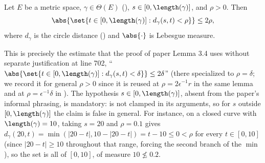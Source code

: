 \begin{helper}
  Let $E$ be a metric space, $\gamma \in \Theta(E)$ (), $s \in [0,\length(\gamma)]$,
  and $\rho > 0$. Then
  \[
    \abs{\set{t \in [0,\length(\gamma)] : d_\gamma(s,t) < \rho}} \leq 2\rho
    ,
  \]
  where $d_\gamma$ is the circle distance () and $\abs{\cdot}$ is Lebesgue measure.

  This is precisely the estimate that the proof of paper Lemma 3.4 uses without separate
  justification at line 702, ``$\abs{\set{t\in[0,\length(\gamma)]:d_\gamma(s,t)<\delta}} \leq
  2\delta$'' (there specialized to $\rho = \delta$; we record it for general $\rho>0$ since it is
  reused at $\rho = 2\epsilon^{-1}r$ in the same lemma and at $\rho = \epsilon^{-1}\delta$ in
  ). The hypothesis $s \in [0,\length(\gamma)]$, absent from the paper's
  informal phrasing, is mandatory:  is not clamped in its arguments, so for $s$
  outside $[0,\length(\gamma)]$ the claim is false in general. For instance, on a closed curve
  with $\length(\gamma) = 10$, taking $s = 20$ and $\rho = 0.1$ gives $d_\gamma(20,t) = \min(|20-t|,
  10 - |20-t|) = t - 10 \leq 0 < \rho$ for every $t \in [0,10]$ (since $|20-t| \geq 10$ throughout
  that range, forcing the second branch of the $\min$), so the set is all of $[0,10]$, of measure
  $10 \not\leq 0.2$.
\end{helper}
